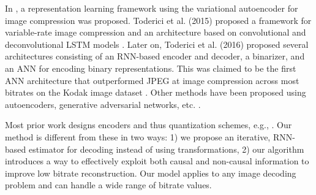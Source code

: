 \documentclass[smallabstract,smallcaptions]{dccpaper}
\begin{document}
In \cite{gregor2016conceptualcompression}, a representation learning framework using the variational autoencoder for image compression was proposed. Toderici et al. (2015) proposed a framework for variable-rate image compression and an architecture based on convolutional and deconvolutional LSTM models \cite{toderici2015}. Later on, Toderici et al. (2016) proposed several architectures consisting of an RNN-based encoder and decoder, a binarizer, and an ANN for encoding binary representations. This was claimed to be the first ANN architecture that outperformed JPEG at image compression across most bitrates on the Kodak image dataset \cite{toderici2016full}. Other methods have been proposed using autoencoders, generative adversarial networks, etc. \cite{Theis2017,rippel2017real}. %

Most prior work designs encoders and thus quantization schemes, e.g., \cite{toderici2015}. Our method is different from these in two ways: 1) we propose an iterative, RNN-based estimator for decoding instead of using transformations, 2) our algorithm introduces a way to effectively exploit both causal and non-causal
information to improve low bitrate reconstruction. Our model applies to any image decoding problem and can handle a wide range of bitrate values.
\end{document}
